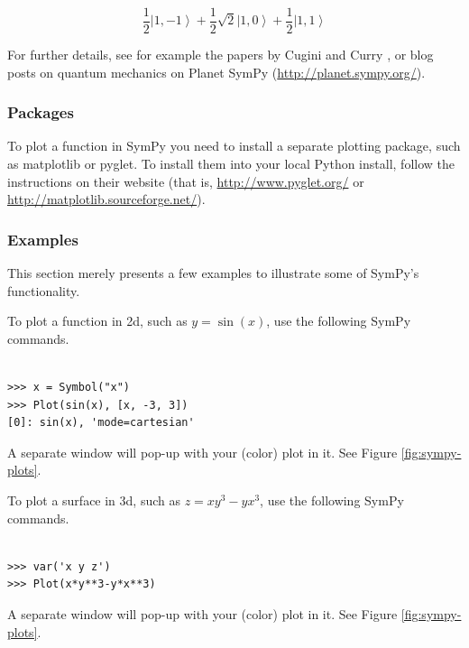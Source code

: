 \documentclass[12pt]{article}
\begin{document}
\[
\frac{1}{2} {\left|1,-1\right\rangle } + \frac{1}{2} \sqrt{2} {\left|1,0\right
\rangle } + \frac{1}{2} {\left|1,1\right\rangle }
\]

For further details, see for example the papers by Cugini \cite{Cug}
and Curry \cite{Cur}, or blog posts on quantum mechanics on
Planet SymPy (\url{http://planet.sympy.org/}).

\subsubsection{Packages}

To plot a function in SymPy you need to install a separate plotting
package, such as matplotlib or pyglet.
To install them into your local Python install, follow the
instructions on their website (that is,
\url{http://www.pyglet.org/} or
\url{http://matplotlib.sourceforge.net/}).

\subsubsection{Examples}

This section merely presents a few examples to illustrate some of
SymPy's functionality.

To plot a function in 2d, such as $y=\sin(x)$,
use the following SymPy commands.

\begin{Verbatim}[fontsize=\scriptsize,fontfamily=courier,fontshape=tt,frame=single,label=SymPy]

>>> x = Symbol("x")
>>> Plot(sin(x), [x, -3, 3])
[0]: sin(x), 'mode=cartesian'

\end{Verbatim}

\noindent
A separate window will pop-up with your (color) plot in it.
See Figure \ref{fig:sympy-plots}.

To plot a surface in 3d, such as $z=xy^3-yx^3$,
use the following SymPy commands.

\begin{Verbatim}[fontsize=\scriptsize,fontfamily=courier,fontshape=tt,frame=single,label=SymPy]

>>> var('x y z')
>>> Plot(x*y**3-y*x**3)

\end{Verbatim}

\noindent
A separate window will pop-up with your (color) plot in it.
See Figure \ref{fig:sympy-plots}.
\end{document}
